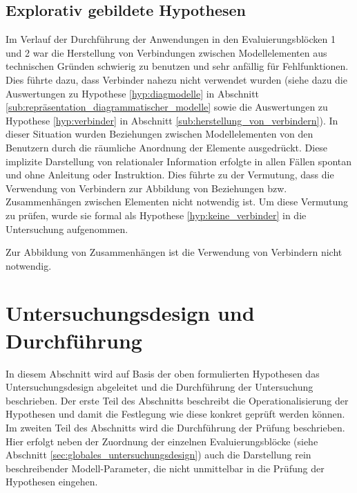 
\subsection{Explorativ gebildete Hypothesen} %
\label{sub:m_explorativ_gebildete_hypothesen}

Im Verlauf der Durchführung der Anwendungen in den Evaluierungsblöcken 1 und 2 war die Herstellung von Verbindungen zwischen Modellelementen aus technischen Gründen schwierig zu benutzen und sehr anfällig für Fehlfunktionen. Dies führte dazu, dass Verbinder nahezu nicht verwendet wurden (siehe dazu die Auswertungen zu Hypothese \ref{hyp:diagmodelle} in Abschnitt \ref{sub:repräsentation_diagrammatischer_modelle} sowie die Auswertungen zu Hypothese \ref{hyp:verbinder} in Abschnitt \ref{sub:herstellung_von_verbindern}). In dieser Situation wurden Beziehungen zwischen Modellelementen von den Benutzern durch die räumliche Anordnung der Elemente ausgedrückt. Diese implizite Darstellung von relationaler Information erfolgte in allen Fällen spontan und ohne Anleitung oder Instruktion. Dies führte zu der Vermutung, dass die Verwendung von Verbindern zur Abbildung von Beziehungen bzw. Zusammenhängen zwischen Elementen nicht notwendig ist. Um diese Vermutung zu prüfen, wurde sie formal als Hypothese \ref{hyp:keine_verbinder} in die Untersuchung aufgenommen.

\begin{hyp}
	\label{hyp:keine_verbinder}
	Zur Abbildung von Zusammenhängen ist die Verwendung von Verbindern nicht notwendig.
\end{hyp}



\section{Untersuchungsdesign und Durchführung} %
\label{sec:m_untersuchungsdesign}

In diesem Abschnitt wird auf Basis der oben formulierten Hypothesen das Untersuchungsdesign abgeleitet und die Durchführung der Untersuchung beschrieben. Der erste Teil des Abschnitts beschreibt die Operationalisierung der Hypothesen und damit die Festlegung wie diese konkret geprüft werden können. Im zweiten Teil des Abschnitts wird die Durchführung der Prüfung beschrieben. Hier erfolgt neben der Zuordnung der einzelnen Evaluierungsblöcke (siehe Abschnitt \ref{sec:globales_untersuchungsdesign}) auch die Darstellung rein beschreibender Modell-Parameter, die nicht unmittelbar in die Prüfung der Hypothesen eingehen. 


